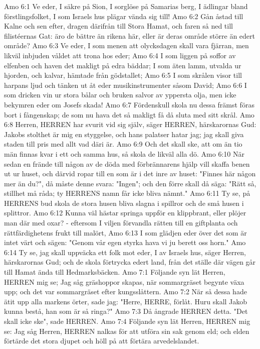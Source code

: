 Amo 6:1  Ve eder, I säkre på Sion, I sorglöse på Samarias berg, I ädlingar bland förstlingsfolket, I som Israels hus plägar vända sig till!
Amo 6:2  Gån åstad till Kalne och sen efter, dragen därifrån till Stora Hamat, och faren så ned till filistéernas Gat: äro de bättre än rikena här, eller är deras område större än edert område?
Amo 6:3  Ve eder, I som menen att olycksdagen skall vara fjärran, men likväl inbjuden våldet att trona hos eder;
Amo 6:4  I som liggen på soffor av elfenben och haven det makligt på edra bäddar; I som äten lamm, utvalda ur hjorden, och kalvar, hämtade från gödstallet;
Amo 6:5  I som skrålen visor till harpans ljud och tänken ut åt eder musikinstrumenter såsom David;
Amo 6:6  I som dricken vin ur stora bålar och bruken salvor av yppersta olja, men icke bekymren eder om Josefs skada!
Amo 6:7  Fördenskull skola nu dessa främst föras bort i fångenskap; de som nu hava det så makligt få då sluta med sitt skrål.
Amo 6:8  Herren, HERREN har svurit vid sig själv, säger HERREN, härskarornas Gud: Jakobs stolthet är mig en styggelse, och hans palatser hatar jag; jag skall giva staden till pris med allt vad däri är.
Amo 6:9  Och det skall ske, att om än tio män finnas kvar i ett och samma hus, så skola de likväl alla dö.
Amo 6:10  När sedan en frände till någon av de döda med förbrännarens hjälp vill skaffa benen ut ur huset, och därvid ropar till en som är i det inre av huset: "Finnes här någon mer än du?", då måste denne svara: "Ingen"; och den förre skall då säga: "Rätt så, stillhet må råda; ty HERRENS namn får icke bliva nämnt."
Amo 6:11  Ty se, på HERRENS bud skola de stora husen bliva slagna i spillror och de små husen i splittror.
Amo 6:12  Kunna väl hästar springa uppför en klippbrant, eller plöjer man där med oxar? - eftersom I viljen förvandla rätten till en giftplanta och rättfärdighetens frukt till malört,
Amo 6:13  I som glädjen eder över det som är intet värt och sägen: "Genom vår egen styrka hava vi ju berett oss horn."
Amo 6:14  Ty se, jag skall uppväcka ett folk mot eder, I av Israels hus, säger Herren, härskarornas Gud; och de skola förtrycka edert land, från det ställe där vägen går till Hamat ända till Hedmarksbäcken.
Amo 7:1  Följande syn lät Herren, HERREN mig se; Jag såg gräshoppor skapas, när sommargräset begynte växa upp; och det var sommargräset efter kungsslåttern.
Amo 7:2  När så dessa hade ätit upp alla markens örter, sade jag: "Herre, HERRE, förlåt. Huru skall Jakob kunna bestå, han som är så ringa?"
Amo 7:3  Då ångrade HERREN detta. "Det skall icke ske", sade HERREN.
Amo 7:4  Följande syn lät Herren, HERREN mig se: Jag såg Herren, HERREN nalkas för att utföra sin sak genom eld; och elden förtärde det stora djupet och höll på att förtära arvedelslandet.
